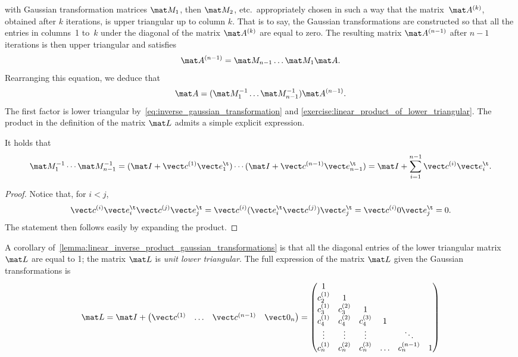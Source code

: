 with Gaussian transformation matrices $\mat M_1$, then $\mat M_2$, etc.\
appropriately chosen in such a way that the matrix~$\mat A^{(k)}$,
obtained after $k$ iterations,
is upper triangular up to column $k$.
That is to say, the Gaussian transformations are constructed so that
all the entries in columns~1 to~$k$ under the diagonal of the matrix $\mat A^{(k)}$ are equal to zero.
The resulting matrix $\mat A^{(n-1)}$ after $n-1$ iterations is then upper triangular
and satisfies
\[
    \mat A^{(n-1)} = \mat M_{n-1} \dotsc \mat M_1 \mat A.
\]
Rearranging this equation,
we deduce that
\[
    \mat A = (\mat M_1^{-1} \dots \mat M_{n-1}^{-1}) \mat A^{(n-1)}.
\]
The first factor is lower triangular by~\eqref{eq:inverse_gaussian_transformation} and \cref{exercise:linear_product_of_lower_triangular}.
The product in the definition of the matrix $\mat L$ admits a simple explicit expression.
\begin{lemma}
    \label{lemma:linear_inverse_product_gaussian_transformations}
    It holds that
    \begin{equation*}
        \mat M_1^{-1} \dotsb \mat M_{n-1}^{-1}
        = (\mat I + \vect c^{(1)} \vect e_1^\t) \dotsb (\mat I + \vect c^{(n-1)} \vect e_{n-1}^\t)
        = \mat I + \sum_{i=1}^{n-1}  \vect c^{(i)} \vect e_i^\t.
    \end{equation*}
\end{lemma}
\begin{proof}
    Notice that, for $i < j$,
    \[
        \vect c^{(i)} \vect e_i^\t \vect c^{(j)} \vect e_j^\t
        = \vect c^{(i)} (\vect e_i^\t \vect c^{(j)}) \vect e_j^\t
        = \vect c^{(i)} 0 \vect e_j^\t = 0.
    \]
    The statement then follows easily by expanding the product.
\end{proof}
A corollary of~\cref{lemma:linear_inverse_product_gaussian_transformations} is that all the diagonal entries of the lower triangular matrix $\mat L$ are equal to 1;
the matrix $\mat L$ is \emph{unit lower triangular}.
The full expression of the matrix $\mat L$ given the Gaussian transformations is
\begin{equation}
    \label{eq:linear_matrix_L}
    \mat L
    = \mat I +
    \begin{pmatrix}
        \vect c^{(1)} & \hdots & \vect c^{(n-1)} & \vect 0_n
    \end{pmatrix}
    =
    \begin{pmatrix}
        1 & \\
        c^{(1)}_2 & 1 \\
        c^{(1)}_3 & c^{(2)}_3 & 1 \\
        c^{(1)}_4 & c^{(2)}_4 & c^{(3)}_4 &  1 \\
        \vdots & \vdots & \vdots & & \ddots \\
        c^{(1)}_n & c^{(2)}_n & c^{(3)}_n & \hdots & c^{(n-1)}_n & 1 \\
    \end{pmatrix}
\end{equation}
